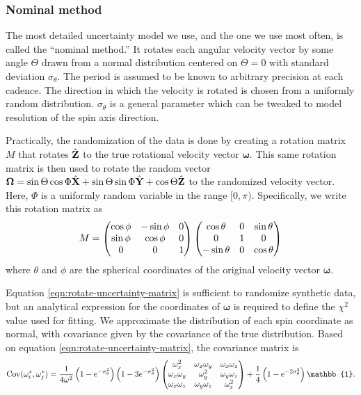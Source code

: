 \documentclass[11pt]{article}
\begin{document}
\subsubsection{Nominal method}
The most detailed uncertainty model we use, and the one we use most often, is called the ``nominal method.'' It rotates each angular velocity vector by some angle $\Theta$ drawn from a normal distribution centered on $\Theta=0$ with standard deviation $\sigma_\theta$. The period is assumed to be known to arbitrary precision at each cadence. The direction in which the velocity is rotated is chosen from a uniformly random distribution. $\sigma_\theta$ is a general parameter which can be tweaked to model resolution of the spin axis direction.

Practically, the randomization of the data is done by creating a rotation matrix $M$ that rotates $\hat{\mathbf{Z}}$ to the true rotational velocity vector $\bm \omega$. This same rotation matrix is then used to rotate the random vector $\bm \Omega = \sin \Theta \cos\Phi \hat{\mathbf{X}} + \sin \Theta \sin \Phi\hat{\mathbf{Y}} + \cos \Theta\hat{\mathbf{Z}}$ to the randomized velocity vector. Here, $\Phi$ is a uniformly random variable in the range $[0, \pi)$. Specifically, we write this rotation matrix as
\begin{equation}
M = \left( \begin{matrix}
\cos \phi & -\sin \phi & 0\\
\sin \phi & \cos \phi & 0\\
0 & 0 & 1
\end{matrix} \right)
\left( \begin{matrix}
\cos \theta & 0 & \sin \theta \\
0 & 1 & 0\\
-\sin \theta & 0 & \cos \theta
\end{matrix} \right)
\label{eqn:rotate-uncertainty-matrix}
\end{equation}
where $\theta$ and $\phi$ are the spherical coordinates of the original velocity vector $\bm \omega.$

Equation \ref{eqn:rotate-uncertainty-matrix} is sufficient to randomize synthetic data, but an analytical expression for the coordinates of $\bm \omega$ is required to define the $\chi^2$ value used for fitting. We approximate the distribution of each spin coordinate as normal, with covariance given by the covariance of the true distribution. Based on equation \ref{eqn:rotate-uncertainty-matrix}, the covariance matrix is
\begin{equation}
\text{Cov}(\omega^*_i, \omega^*_j) = \frac{1}{4 \omega^2}\parens{1-e^{-\sigma_\theta^2}} \parens{1-3e^{-\sigma_\theta^2}}\parens{\begin{matrix}
\omega_x^2 & \omega_x \omega_y& \omega_x \omega_z\\
\omega_x \omega_y & \omega_y^2 & \omega_y \omega_z\\
\omega_x \omega_z & \omega_y \omega_z& \omega_z^2
\end{matrix}} +  \frac{1}{4}\parens{1 - e^{-2\sigma_\theta^2}} \mathbb{1}.
\label{eqn:rotate-uncertainty-var}
\end{equation}
\end{document}
